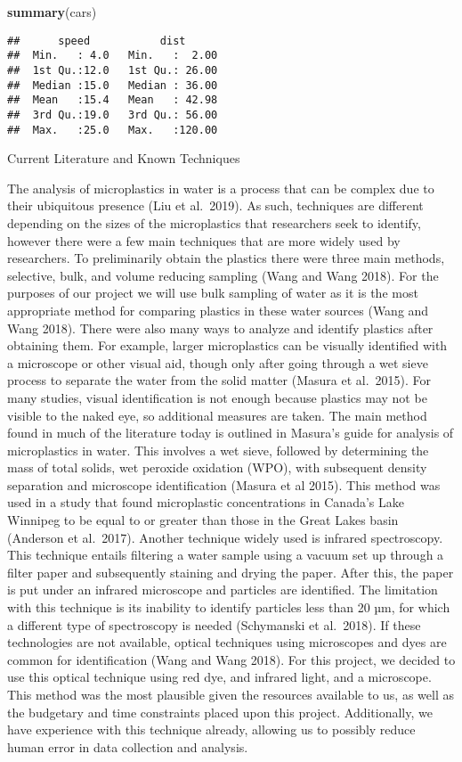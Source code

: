 \documentclass[]{article}
\newenvironment{Shaded}{\begin{snugshade}}{\end{snugshade}}
\newcommand{\KeywordTok}[1]{\textcolor[rgb]{0.13,0.29,0.53}{\textbf{#1}}}
\newcommand{\NormalTok}[1]{#1}
\begin{document}
\begin{Shaded}
\begin{Highlighting}[]
\KeywordTok{summary}\NormalTok{(cars)}
\end{Highlighting}
\end{Shaded}

\begin{verbatim}
##      speed           dist       
##  Min.   : 4.0   Min.   :  2.00  
##  1st Qu.:12.0   1st Qu.: 26.00  
##  Median :15.0   Median : 36.00  
##  Mean   :15.4   Mean   : 42.98  
##  3rd Qu.:19.0   3rd Qu.: 56.00  
##  Max.   :25.0   Max.   :120.00
\end{verbatim}

Current Literature and Known Techniques

The analysis of microplastics in water is a process that can be complex
due to their ubiquitous presence (Liu et al.~2019). As such, techniques
are different depending on the sizes of the microplastics that
researchers seek to identify, however there were a few main techniques
that are more widely used by researchers. To preliminarily obtain the
plastics there were three main methods, selective, bulk, and volume
reducing sampling (Wang and Wang 2018). For the purposes of our project
we will use bulk sampling of water as it is the most appropriate method
for comparing plastics in these water sources (Wang and Wang 2018).
There were also many ways to analyze and identify plastics after
obtaining them. For example, larger microplastics can be visually
identified with a microscope or other visual aid, though only after
going through a wet sieve process to separate the water from the solid
matter (Masura et al.~2015). For many studies, visual identification is
not enough because plastics may not be visible to the naked eye, so
additional measures are taken. The main method found in much of the
literature today is outlined in Masura's guide for analysis of
microplastics in water. This involves a wet sieve, followed by
determining the mass of total solids, wet peroxide oxidation (WPO), with
subsequent density separation and microscope identification (Masura et
al 2015). This method was used in a study that found microplastic
concentrations in Canada's Lake Winnipeg to be equal to or greater than
those in the Great Lakes basin (Anderson et al.~2017). Another technique
widely used is infrared spectroscopy. This technique entails filtering a
water sample using a vacuum set up through a filter paper and
subsequently staining and drying the paper. After this, the paper is put
under an infrared microscope and particles are identified. The
limitation with this technique is its inability to identify particles
less than 20 µm, for which a different type of spectroscopy is needed
(Schymanski et al.~2018). If these technologies are not available,
optical techniques using microscopes and dyes are common for
identification (Wang and Wang 2018). For this project, we decided to use
this optical technique using red dye, and infrared light, and a
microscope. This method was the most plausible given the resources
available to us, as well as the budgetary and time constraints placed
upon this project. Additionally, we have experience with this technique
already, allowing us to possibly reduce human error in data collection
and analysis.
\end{document}
